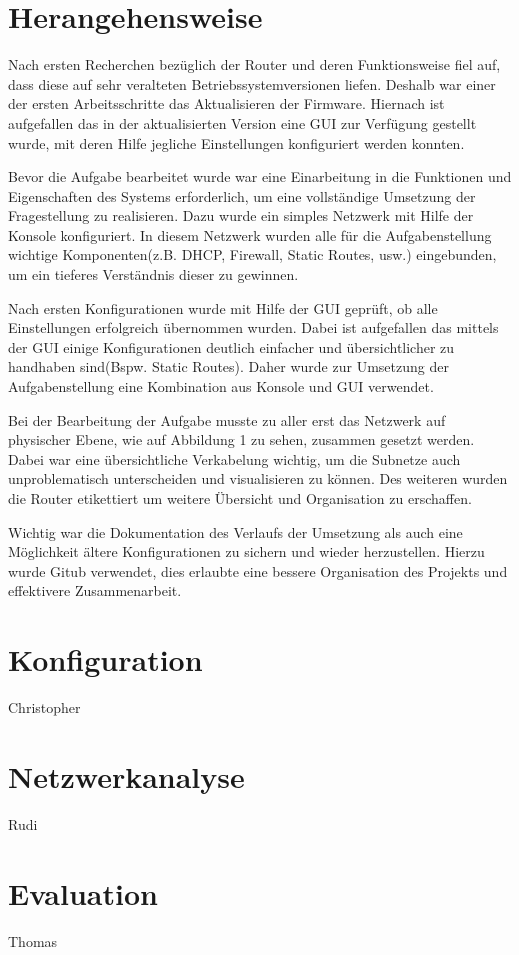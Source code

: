 \documentclass[10pt,a4paper]{article}
\begin{document}
	\section{Herangehensweise}
	Nach ersten Recherchen bezüglich der Router und deren Funktionsweise fiel auf, dass diese auf sehr veralteten Betriebssystemversionen liefen. Deshalb war einer der ersten Arbeitsschritte das Aktualisieren der Firmware. Hiernach ist aufgefallen das in der aktualisierten Version eine GUI zur Verfügung gestellt wurde, mit deren Hilfe jegliche Einstellungen konfiguriert werden konnten. 
\par
	Bevor die Aufgabe bearbeitet wurde war eine Einarbeitung in die Funktionen und Eigenschaften des Systems erforderlich, um eine vollständige Umsetzung der Fragestellung zu realisieren. Dazu wurde ein simples Netzwerk mit Hilfe der Konsole konfiguriert. In diesem Netzwerk wurden alle für die Aufgabenstellung wichtige Komponenten(z.B. DHCP, Firewall, Static Routes, usw.) eingebunden, um ein tieferes Verständnis dieser zu gewinnen.
\par
	Nach ersten Konfigurationen wurde mit Hilfe der GUI geprüft, ob alle Einstellungen erfolgreich übernommen wurden. Dabei ist aufgefallen das mittels der GUI einige Konfigurationen deutlich einfacher und übersichtlicher zu handhaben sind(Bspw. Static Routes). Daher wurde zur Umsetzung der Aufgabenstellung eine Kombination aus Konsole und GUI verwendet.
\par
	Bei der Bearbeitung der Aufgabe musste zu aller erst das Netzwerk auf physischer Ebene, wie auf Abbildung 1 zu sehen, zusammen gesetzt werden. Dabei war eine übersichtliche Verkabelung wichtig, um die Subnetze auch unproblematisch unterscheiden und visualisieren zu können. Des weiteren wurden die Router etikettiert um weitere Übersicht und Organisation zu erschaffen.
\par
	Wichtig war die Dokumentation des Verlaufs der Umsetzung als auch eine Möglichkeit ältere Konfigurationen zu sichern und wieder herzustellen. Hierzu wurde Gitub verwendet, dies erlaubte eine bessere Organisation des Projekts und effektivere Zusammenarbeit.
	
	
	\section{Konfiguration}Christopher
	
	
	\section{Netzwerkanalyse}Rudi
	
	
	\section{Evaluation}Thomas
\end{document}
